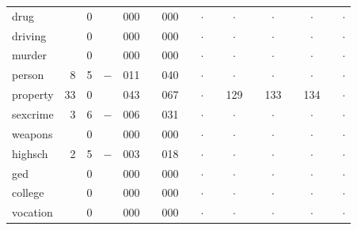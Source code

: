 \begin{table}[t]
\begin{center}
\begin{tabular}{lr@{.}lr@{.}lr@{.}lr@{.}lr@{.}lr@{.}lr@{.}lr@{.}l}
drug      &     & 0 &   & 000 &   & 000 & \multicolumn{2}{c}{\ \ $\cdot$} & \multicolumn{2}{c}{\ \ $\cdot$} & \multicolumn{2}{c}{\ \ $\cdot$} & \multicolumn{2}{c}{\ \ $\cdot$} & \multicolumn{2}{c}{\ \ $\cdot$} \\
driving     &     & 0 &   & 000 &   & 000 & \multicolumn{2}{c}{\ \ $\cdot$} & \multicolumn{2}{c}{\ \ $\cdot$} & \multicolumn{2}{c}{\ \ $\cdot$} & \multicolumn{2}{c}{\ \ $\cdot$} & \multicolumn{2}{c}{\ \ $\cdot$} \\
murder    &     & 0 &   & 000 &   & 000 & \multicolumn{2}{c}{\ \ $\cdot$} & \multicolumn{2}{c}{\ \ $\cdot$} & \multicolumn{2}{c}{\ \ $\cdot$} & \multicolumn{2}{c}{\ \ $\cdot$} & \multicolumn{2}{c}{\ \ $\cdot$} \\
person    &   8 & 5 &$-$& 011 &   & 040 & \multicolumn{2}{c}{\ \ $\cdot$} & \multicolumn{2}{c}{\ \ $\cdot$} & \multicolumn{2}{c}{\ \ $\cdot$} & \multicolumn{2}{c}{\ \ $\cdot$} & \multicolumn{2}{c}{\ \ $\cdot$} \\
property      &  33 & 0 &   & 043 &   & 067 & \multicolumn{2}{c}{\ \ $\cdot$} & & 129 &   & 133 &   & 134  & \multicolumn{2}{c}{\ \ $\cdot$} \\
sexcrime       &   3 & 6 &$-$& 006 &   & 031 & \multicolumn{2}{c}{\ \ $\cdot$} & \multicolumn{2}{c}{\ \ $\cdot$} & \multicolumn{2}{c}{\ \ $\cdot$} & \multicolumn{2}{c}{\ \ $\cdot$} & \multicolumn{2}{c}{\ \ $\cdot$} \\
weapons   &     & 0 &   & 000 &   & 000 & \multicolumn{2}{c}{\ \ $\cdot$} & \multicolumn{2}{c}{\ \ $\cdot$} & \multicolumn{2}{c}{\ \ $\cdot$} & \multicolumn{2}{c}{\ \ $\cdot$} & \multicolumn{2}{c}{\ \ $\cdot$} \\
highsch &   2 & 5 &$-$& 003 &   & 018 & \multicolumn{2}{c}{\ \ $\cdot$} & \multicolumn{2}{c}{\ \ $\cdot$} & \multicolumn{2}{c}{\ \ $\cdot$} & \multicolumn{2}{c}{\ \ $\cdot$} & \multicolumn{2}{c}{\ \ $\cdot$} \\
ged          &     & 0 &   & 000 &   & 000 & \multicolumn{2}{c}{\ \ $\cdot$} & \multicolumn{2}{c}{\ \ $\cdot$} & \multicolumn{2}{c}{\ \ $\cdot$} & \multicolumn{2}{c}{\ \ $\cdot$} & \multicolumn{2}{c}{\ \ $\cdot$} \\
college  &     & 0 &   & 000 &   & 000 & \multicolumn{2}{c}{\ \ $\cdot$} & \multicolumn{2}{c}{\ \ $\cdot$} & \multicolumn{2}{c}{\ \ $\cdot$} & \multicolumn{2}{c}{\ \ $\cdot$} & \multicolumn{2}{c}{\ \ $\cdot$} \\
vocation     &     & 0 &   & 000 &   & 000 & \multicolumn{2}{c}{\ \ $\cdot$} & \multicolumn{2}{c}{\ \ $\cdot$} & \multicolumn{2}{c}{\ \ $\cdot$} & \multicolumn{2}{c}{\ \ $\cdot$} & \multicolumn{2}{c}{\ \ $\cdot$} \\

\end{tabular}
\end{center}
\end{table}
